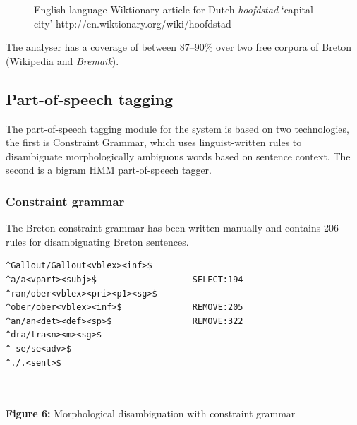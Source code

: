 \documentclass[a0,landscape]{a0poster}
\begin{document}
\begin{multicols}{4}
\begin{minipage}
\begin{figure}
\begin{tiny}
\begin{tabular}{|l|}
\hline
\end{tabular}
\end{tiny}
\caption{English language Wiktionary article for Dutch \emph{hoofdstad} `capital city' 
    {\small http://en.wiktionary.org/wiki/hoofdstad}}
\label{fig:wikt1}
\end{figure}
\end{minipage}
\vspace{0.5cm}

\noindent
The analyser has a coverage of between 87--90\% over two free corpora of Breton (Wikipedia and \emph{Bremaik}).

\subsection{Part-of-speech tagging}

\noindent
The part-of-speech tagging module for the system is based on two technologies, the first is 
Constraint Grammar, which uses linguist-written rules to disambiguate
morphologically ambiguous words based on sentence context. The second is a
bigram HMM part-of-speech tagger.

\subsubsection{Constraint grammar}

\noindent
The Breton constraint grammar has been written manually and contains 206 rules
for disambiguating Breton sentences. \\

\begin{center}
\begin{minipage}[b]{25cm}
\begin{small}
\begin{verbatim}
^Gallout/Gallout<vblex><inf>$    
^a/a<vpart><subj>$                   SELECT:194
^ran/ober<vblex><pri><p1><sg>$ 
^ober/ober<vblex><inf>$              REMOVE:205
^an/an<det><def><sp>$                REMOVE:322
^dra/tra<n><m><sg>$ 
^-se/se<adv>$
^./.<sent>$
\end{verbatim}
\end{small}
\end{minipage}\\
~\\
\textbf{Figure 6:} Morphological disambiguation with constraint grammar
\vspace{0.5cm}
\end{center}


\end{multicols}
\end{document}
